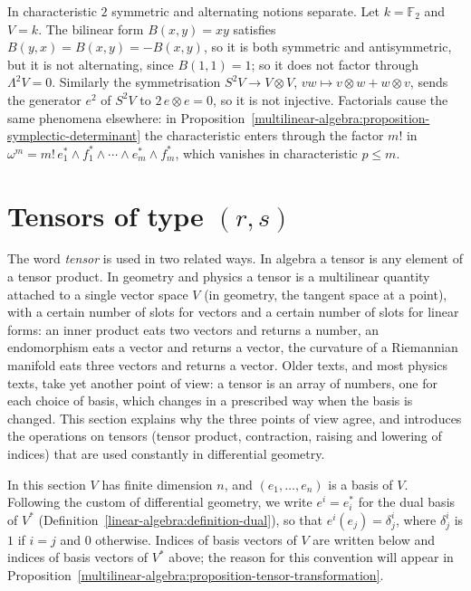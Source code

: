 \begin{counterexample}\label{multilinear-algebra:counterexample-characteristic-two}
In characteristic $2$ symmetric and alternating notions separate. Let $k = \mathbb{F}_2$ and $V = k$. The bilinear form $B(x, y) = xy$ satisfies $B(y, x) = B(x, y) = -B(x, y)$, so it is both symmetric and
antisymmetric, but it is not alternating, since $B(1, 1) = 1$; so it does not factor through $\Lambda^2V = 0$. Similarly the symmetrisation $S^2V \to V \otimes V$, $vw \mapsto v \otimes w + w \otimes v$, sends the generator $e^2$
of $S^2V$ to $2\,e \otimes e = 0$, so it is not injective. Factorials cause the same phenomena elsewhere: in Proposition~\ref{multilinear-algebra:proposition-symplectic-determinant} the characteristic enters through the factor $m!$ in
$\omega^m = m!\,e_1^* \wedge f_1^* \wedge \cdots \wedge e_m^* \wedge f_m^*$, which vanishes in characteristic $p \leq m$.
\end{counterexample}

\section{Tensors of type $(r,s)$}\label{multilinear-algebra:section-tensors}

The word \emph{tensor} is used in two related ways. In algebra a tensor is any element of a tensor product. In geometry and physics a tensor is a multilinear
quantity attached to a single vector space $V$ (in geometry, the tangent space at a point), with a certain number of slots for vectors and a certain number of
slots for linear forms: an inner product eats two vectors and returns a number, an endomorphism eats a vector and returns a vector, the curvature of a Riemannian
manifold eats three vectors and returns a vector. Older texts, and most physics texts, take yet another point of view: a tensor is an array of numbers, one for each
choice of basis, which changes in a prescribed way when the basis is changed. This section explains why the three points of view agree, and introduces the operations
on tensors (tensor product, contraction, raising and lowering of indices) that are used constantly in differential geometry.

In this section $V$ has finite dimension $n$, and $(e_1, \ldots, e_n)$ is a basis of $V$. Following the custom of differential geometry, we write
$e^i = e_i^*$ for the dual basis of $V^*$ (Definition~\ref{linear-algebra:definition-dual}), so that $e^i(e_j) = \delta^i_j$, where $\delta^i_j$ is $1$ if $i = j$
and $0$ otherwise. Indices of basis vectors of $V$ are written below and indices of basis vectors of $V^*$ above; the reason for this convention will appear
in Proposition~\ref{multilinear-algebra:proposition-tensor-transformation}.

